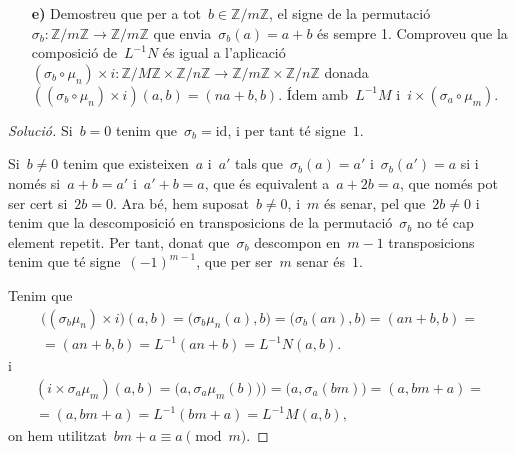 \documentclass[a4paper]{article}
\newcommand{\ZZ}{\mathbb{Z}}
\newcommand{\id}{\mathrm{id}}
\newenvironment{solution}{
    \renewcommand\qedsymbol{\ensuremath{\lozenge}}
    \begin{proof}[Solució]
        }{
    \end{proof}
}
\begin{document}
\begin{enumerate}
    \item[\textbf{e)}] Demostreu que per a tot~\(b\in\ZZ/m\ZZ\), el signe de la
        permutació~\(\sigma_{b}:\ZZ/m\ZZ\rightarrow\ZZ/m\ZZ\) que
        envia~\(\sigma_{b}(a)=a+b\) és sempre 1.
        Comproveu que la composició de~\(L^{-1}N\) és igual a
        l'aplicació~\((\sigma_{b}\circ\mu_{n})\times
        i:\ZZ/M\ZZ\times\ZZ/n\ZZ\rightarrow\ZZ/m\ZZ\times\ZZ/n\ZZ\)
        donada~\(((\sigma_{b}\circ\mu_{n})\times i)(a,b)=(na+b,b)\).
        Ídem amb~\(L^{-1}M\) i~\(i\times(\sigma_{a}\circ\mu_{m})\).
\end{enumerate}

\begin{solution}
    Si~\(b=0\) tenim que~\(\sigma_{b}=\id\), i per tant té signe~\(1\).

    Si~\(b\neq0\) tenim que existeixen~\(a\) i~\(a'\) tals
    que~\(\sigma_{b}(a)=a'\) i~\(\sigma_{b}(a')=a\) si i només si~\(a+b=a'\)
    i~\(a'+b=a\), que és equivalent a~\(a+2b=a\), que només pot ser cert
    si~\(2b=0\). Ara bé, hem suposat~\(b\neq0\), i~\(m\) és senar, pel
    que~\(2b\neq0\) i tenim que la descomposició en transposicions de la
    permutació~\(\sigma_{b}\) no té cap element repetit. Per tant, donat
    que~\(\sigma_{b}\) descompon en~\(m-1\) transposicions tenim que té
    signe~\((-1)^{m-1}\), que per ser~\(m\) senar és~\(1\).

    Tenim que
    \begin{multline*}
        \bigl((\sigma_{b}\mu_{n})\times i\bigr)(a,b)
        =
        \bigl(\sigma_{b}\mu_{n}(a),b\bigr)
        =
        \bigl(\sigma_{b}(an),b\bigr)
        =
        (an+b,b)
        = \\ =
        (an+b,b)
        =
        L^{-1}(an+b)
        =
        L^{-1}N(a,b).
    \end{multline*}
    i
    \begin{multline*}
        (i\times\sigma_{a}\mu_{m})(a,b)
        =
        \bigl(a,\sigma_{a}\mu_{m}(b))\bigr)
        =
        \bigl(a,\sigma_{a}(bm)\bigr)
        =
        (a,bm+a)
        = \\ =
        (a,bm+a)
        =
        L^{-1}(bm+a)
        =
        L^{-1}M(a,b),
    \end{multline*}
    on hem utilitzat~\(bm+a\equiv a\pmod{m}\).
\end{solution}
\end{document}
